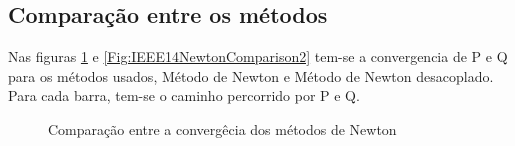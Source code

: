 \subsection{Comparação entre os métodos}
Nas figuras \ref{Fig:IEEE14_NewtonComparison1} e \ref{Fig:IEEE14NewtonComparison2} tem-se a convergencia de P e Q para os métodos usados, Método de Newton e Método de Newton desacoplado. Para cada barra, tem-se o caminho percorrido por P e Q. 
\begin{figure}[!htb]
    \centering
    \qquad
    \qquad
    \qquad

    
    \caption{Comparação entre a convergêcia dos métodos de Newton }%
    \label{Fig:IEEE14_NewtonComparison1}%
\end{figure}
